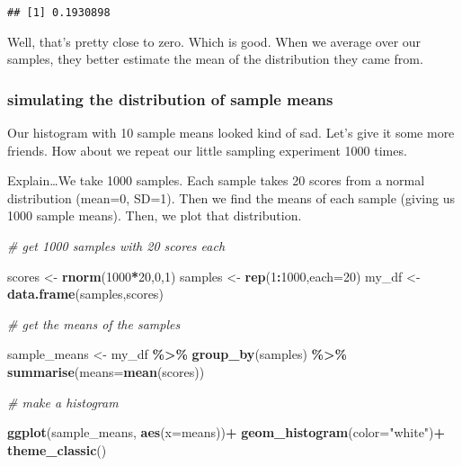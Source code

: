 \documentclass[
]{book}
\newenvironment{Shaded}{\begin{snugshade}}{\end{snugshade}}
\newcommand{\AttributeTok}[1]{\textcolor[rgb]{0.13,0.29,0.53}{#1}}
\newcommand{\CommentTok}[1]{\textcolor[rgb]{0.56,0.35,0.01}{\textit{#1}}}
\newcommand{\DecValTok}[1]{\textcolor[rgb]{0.00,0.00,0.81}{#1}}
\newcommand{\FunctionTok}[1]{\textcolor[rgb]{0.13,0.29,0.53}{\textbf{#1}}}
\newcommand{\NormalTok}[1]{#1}
\newcommand{\OtherTok}[1]{\textcolor[rgb]{0.56,0.35,0.01}{#1}}
\newcommand{\SpecialCharTok}[1]{\textcolor[rgb]{0.81,0.36,0.00}{\textbf{#1}}}
\newcommand{\StringTok}[1]{\textcolor[rgb]{0.31,0.60,0.02}{#1}}
\begin{document}
\begin{Shaded}
\end{Shaded}

\begin{verbatim}
## [1] 0.1930898
\end{verbatim}

Well, that's pretty close to zero. Which is good. When we average over
our samples, they better estimate the mean of the distribution they came
from.

\hypertarget{simulating-the-distribution-of-sample-means}{%
\subsubsection{simulating the distribution of sample means}\label{simulating-the-distribution-of-sample-means}}

Our histogram with 10 sample means looked kind of sad. Let's give it
some more friends. How about we repeat our little sampling experiment
1000 times.

Explain\ldots We take 1000 samples. Each sample takes 20 scores from a
normal distribution (mean=0, SD=1). Then we find the means of each
sample (giving us 1000 sample means). Then, we plot that distribution.

\begin{Shaded}
\begin{Highlighting}[]
\CommentTok{\# get 1000 samples with 20 scores each}

\NormalTok{scores }\OtherTok{\textless{}{-}} \FunctionTok{rnorm}\NormalTok{(}\DecValTok{1000}\SpecialCharTok{*}\DecValTok{20}\NormalTok{,}\DecValTok{0}\NormalTok{,}\DecValTok{1}\NormalTok{)}
\NormalTok{samples }\OtherTok{\textless{}{-}} \FunctionTok{rep}\NormalTok{(}\DecValTok{1}\SpecialCharTok{:}\DecValTok{1000}\NormalTok{,}\AttributeTok{each=}\DecValTok{20}\NormalTok{)}
\NormalTok{my\_df }\OtherTok{\textless{}{-}} \FunctionTok{data.frame}\NormalTok{(samples,scores)}

\CommentTok{\# get the means of the samples}

\NormalTok{sample\_means }\OtherTok{\textless{}{-}}\NormalTok{ my\_df }\SpecialCharTok{\%\textgreater{}\%}
                \FunctionTok{group\_by}\NormalTok{(samples) }\SpecialCharTok{\%\textgreater{}\%}
                \FunctionTok{summarise}\NormalTok{(}\AttributeTok{means=}\FunctionTok{mean}\NormalTok{(scores))}

\CommentTok{\# make a histogram}

 \FunctionTok{ggplot}\NormalTok{(sample\_means, }\FunctionTok{aes}\NormalTok{(}\AttributeTok{x=}\NormalTok{means))}\SpecialCharTok{+}
  \FunctionTok{geom\_histogram}\NormalTok{(}\AttributeTok{color=}\StringTok{"white"}\NormalTok{)}\SpecialCharTok{+}
  \FunctionTok{theme\_classic}\NormalTok{()}
\end{Highlighting}
\end{Shaded}
\end{document}
